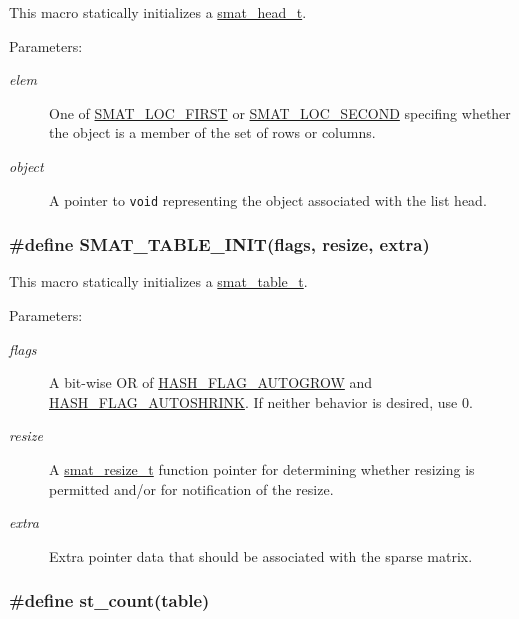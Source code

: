 This macro statically initializes a \hyperlink{group__dbprim__smat_a1}{smat\_\-head\_\-t}.\begin{Desc}
\item[Parameters: ]\par
\begin{description}
\item[{\em 
elem}]One of \hyperlink{group__dbprim__smat_a48a136}{SMAT\_\-LOC\_\-FIRST} or \hyperlink{group__dbprim__smat_a48a137}{SMAT\_\-LOC\_\-SECOND} specifing whether the object is a member of the set of rows or columns. \item[{\em 
object}]A pointer to {\tt void} representing the object associated with the list head. \end{description}
\end{Desc}
\hypertarget{group__dbprim__smat_a21}{
\subsubsection[SMAT\_\-TABLE\_\-INIT]{\setlength{\rightskip}{0pt plus 5cm}\#define SMAT\_\-TABLE\_\-INIT(flags, resize, extra)}}
\label{group__dbprim__smat_a21}


This macro statically initializes a \hyperlink{group__dbprim__smat_a0}{smat\_\-table\_\-t}.\begin{Desc}
\item[Parameters: ]\par
\begin{description}
\item[{\em 
flags}]A bit-wise OR of \hyperlink{group__dbprim__hash_a16}{HASH\_\-FLAG\_\-AUTOGROW} and \hyperlink{group__dbprim__hash_a17}{HASH\_\-FLAG\_\-AUTOSHRINK}. If neither behavior is desired, use 0. \item[{\em 
resize}]A \hyperlink{group__dbprim__smat_a3}{smat\_\-resize\_\-t} function pointer for determining whether resizing is permitted and/or for notification of the resize. \item[{\em 
extra}]Extra pointer data that should be associated with the sparse matrix. \end{description}
\end{Desc}
\hypertarget{group__dbprim__smat_a26}{
\subsubsection[st\_\-count]{\setlength{\rightskip}{0pt plus 5cm}\#define st\_\-count(table)}}
\label{group__dbprim__smat_a26}


